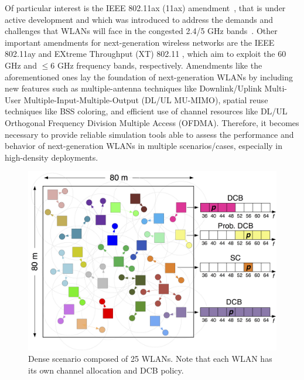 \documentclass{article}
\begin{document}
	Of particular interest is the IEEE 802.11ax (11ax) amendment~\cite{tgax2017draft}, that is under active development and which was introduced to address the demands and challenges that WLANs will face in the congested 2.4/5 GHz bands~\cite{7422404_bellalta11ax}. Other important amendments for next-generation wireless networks are the IEEE 802.11ay \cite{ghasempour2017ieee} and EXtreme Throughput (XT) 802.11 \cite{xtreme_throughput}, which aim to exploit the 60 GHz and $\leq 6$ GHz frequency bands, respectively. Amendments like the aforementioned ones lay the foundation of next-generation WLANs by including new features such as multiple-antenna techniques like Downlink/Uplink Multi-User Multiple-Input-Multiple-Output (DL/UL MU-MIMO), spatial reuse techniques like BSS coloring, and efficient use of channel resources like DL/UL Orthogonal Frequency Division Multiple Access (OFDMA). Therefore, it becomes necessary to provide reliable simulation tools able to assess the performance and behavior of next-generation WLANs in multiple scenarios/cases, especially in high-density deployments.
	
	\begin{figure}[t]
		\centering	
		\includegraphics[width=0.65\columnwidth]{map_central.png}
		\caption{Dense scenario composed of 25 WLANs. Note that each WLAN has its own channel allocation and DCB policy.}
		\label{fig:map_dense}
	\end{figure}
	
\end{document}
